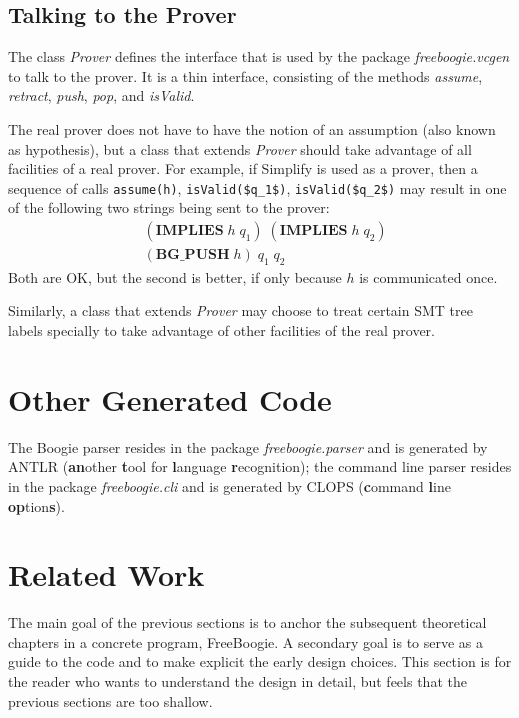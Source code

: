 \documentclass{llncs}
\newcommand{\jmlCode}{\lstinline[style=jml,basicstyle=\normalsize]}
\def\fb#1{{\bf #1}} %
\begin{document}
\subsection{Talking to the Prover}

The class \textit{Prover} defines the interface that is used
by the package \textit{freeboogie.vcgen} to talk to the
prover. It is a thin interface, consisting of the methods
\textit{assume}, \textit{retract}, \textit{push}, \textit{pop},
and \textit{isValid}.

The real prover does not have to have the notion of an
assumption (also known as hypothesis), but a class that extends
\textit{Prover} should take advantage of all facilities of a real
prover. For example, if Simplify is used as a prover, then a
sequence of calls \jmlCode|assume(h)|, \jmlCode|isValid($q_1$)|,
\jmlCode|isValid($q_2$)| may result in one of the following two
strings being sent to the prover:
\begin{align}
&(\mathbf{IMPLIES}\;h\;q_1)\;(\mathbf{IMPLIES}\;h\;q_2)\\
&(\mathbf{BG\_PUSH}\;h)\;q_1\;q_2
\end{align}
Both are OK, but the second is better, if only because
$h$ is communicated once.

Similarly, a class that extends \textit{Prover} may choose to
treat certain SMT tree labels specially to take advantage of
other facilities of the real prover.

\section{Other Generated Code}

The Boogie parser resides in the package
\textit{freeboogie.parser} and is generated by ANTLR
(\textbf{an}other \fb tool for \fb language \fb
recognition); the command line parser resides in the package
\textit{freeboogie.cli} and is generated by CLOPS (\fb command
\fb line \textbf{op}tion\textbf{s}).

\section{Related Work}

The main goal of the previous sections is to anchor the
subsequent theoretical chapters in a concrete program,
FreeBoogie. A secondary goal is to serve as a guide to the code
and to make explicit the early design choices. This section is
for the reader who wants to understand the design in detail, but
feels that the previous sections are too shallow.
\end{document}
